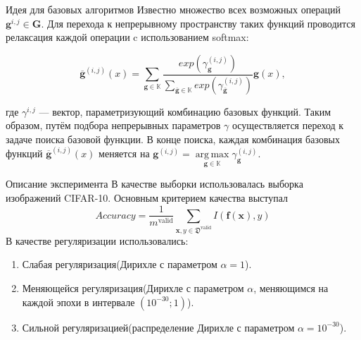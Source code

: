 \documentclass[10pt]{beamer}
\DeclareMathOperator*{\argmax}{arg\,max}
\begin{document}
\begin{frame}{Идея для базовых алгоритмов}
Известно множество всех возможных операций $\mathbf{g}^{i,j} \in \mathbf{G}$. Для перехода к непрерывному пространству таких функций проводится релаксация каждой операции c использованием softmax:


$$\overline{\mathbf{g}}^{(i, j)}(x) = \sum\limits_{\mathbf{g} \in \mathbb{K}}{\frac{exp(\gamma_{\mathbf{g}}^{(i, j)})}{\sum\limits_{\overline{\mathbf{g}} \in \mathbb{K}}exp(\gamma_{\overline{\mathbf{g}}}^{(i, j)})}\mathbf{g}(x)},$$


где $\gamma^{i, j}$ --- вектор, параметризующий комбинацию базовых функций. Таким образом, путём подбора  непрерывных параметров  $\gamma$ осуществляется переход к задаче поиска базовой функции. В конце поиска, каждая комбинация базовых функций $\overline{\mathbf{g}}^{(i, j)}(x) $  меняется на $\mathbf{g}^{(i, j)} = \argmax\limits_{\mathbf{g} \in \mathbb{K}}\gamma_{\mathbf{g}}^{(i, j)}$.\\


\end{frame}

\begin{frame}{Описание эксперимента}
В качестве выборки использовалась выборка изображений CIFAR-10. Основным критерием качества выступал 
$$Accuracy = \frac{1}{m^\text{valid}}\sum_{\mathbf{x}, y \in \mathfrak{D}^\text{valid}} I(\mathbf{f}(\mathbf{x}), y)$$
В качестве регуляризации использовались:\\
\begin{enumerate}
    \item Слабая регуляризация(Дирихле с параметром $\alpha = 1$).\\
    \item Меняющейся регуляризация(Дирихле с параметром $\alpha$, меняющимся на каждой эпохи в интервале $(10^{-30}; 1)$).\\
    \item Сильной регуляризацией(распределение Дирихле с параметром  $\alpha= 10^{-30}$).\\
\end{enumerate}
\end{frame}

\end{document}
